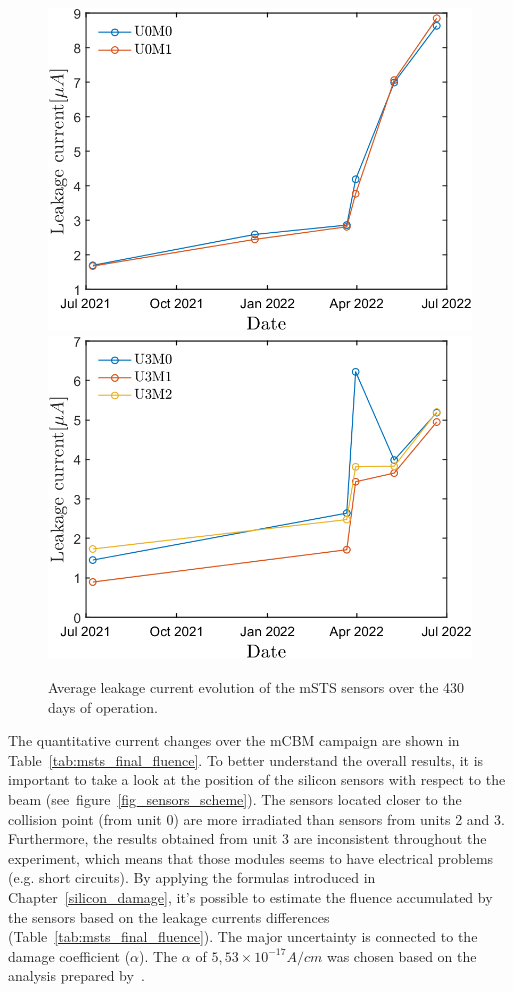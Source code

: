 \begin{figure}[!h]
\centering
\includegraphics[width=0.48\columnwidth]{Chapter6/DCS/images/sensors/U0_leakage.png}
\includegraphics[width=0.48\columnwidth]{Chapter6/DCS/images/sensors/U3_leakage.png}
\caption{Average leakage current evolution of the \gls{mSTS} sensors over the 430 days of operation. }
\label{fig_leak}
\end{figure}

\newpage
The quantitative current changes over the \gls{mCBM} campaign are shown in Table~\ref{tab:msts_final_fluence}. To better understand the overall results, it is important to take a look at the position of the silicon sensors with respect to the beam (see~figure~\ref{fig_sensors_scheme}). The sensors located closer to the collision point (from unit 0) are more irradiated than sensors from units 2 and 3. Furthermore, the results obtained from unit 3 are inconsistent throughout the experiment, which means that those modules seems to have electrical problems (e.g. short circuits). By applying the formulas introduced in Chapter~\ref{silicon_damage}, it's possible to estimate the fluence accumulated by the sensors based on the leakage currents differences (Table~\ref{tab:msts_final_fluence}).
The major uncertainty is connected to the damage coefficient ($\alpha$). The $\alpha$ of $5,53\times 10^{-17} A/cm$ was chosen based on the analysis prepared by~\cite{Larionov:2016eoz}. 

